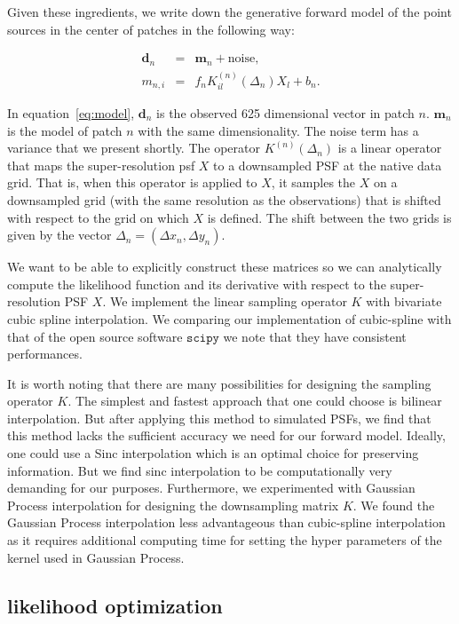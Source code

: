 Given these ingredients, we write down the generative forward model of the point sources in the center of patches in the following way:

\begin{eqnarray}
\mathbf{d}_{n} &=&  \mathbf{m}_{n} + \mathrm{noise}, \\
m_{n,i} &=& f_{n}K^{(n)}_{il} (\Delta_n) X_{l} + b_{n}. 
\label{eq:model}
\end{eqnarray} 

In equation~\ref{eq:model}, $\mathbf{d}_{n}$ is the observed 625 dimensional vector in patch $n$. $\mathbf{m}_{n}$ is the model of patch $n$ with the same dimensionality. The 
noise term  has a variance that we present shortly.
The operator $K^{(n)}(\Delta_n)$ is a linear operator that maps the super-resolution psf $X$ to a downsampled PSF at the native 
data grid. That is, when this operator is applied to $X$, it samples the $X$ on a downsampled grid (with the same resolution as the observations) 
that is shifted with respect to the grid on which $X$ is defined. The shift between the two grids is given by the vector $\Delta_n = (\Delta x_n , \Delta y_n)$.


We want to be able to explicitly construct these matrices so we can analytically compute the likelihood function and its derivative with respect to the super-resolution PSF $X$. 
We implement the linear sampling operator $K$ with bivariate cubic spline interpolation. We comparing our implementation of cubic-spline with that of the open source 
software $\mathtt{scipy}$ we note that they have consistent performances.

It is worth noting that there are many possibilities for designing the sampling operator $K$.  The simplest and fastest approach that one could 
choose is bilinear interpolation. But after applying this method to simulated PSFs, we find that this method lacks the sufficient accuracy we 
need for our forward model. Ideally, one could use a Sinc interpolation \citep{bickerton,galsim} which is an optimal choice for preserving information.
But we find sinc interpolation to be computationally very demanding for our purposes. Furthermore, we experimented with Gaussian Process interpolation for designing the downsampling matrix $K$. We found the Gaussian Process interpolation less advantageous than cubic-spline interpolation as it requires additional computing time for setting the hyper parameters of the kernel used in Gaussian Process.

\subsection{likelihood optimization}


